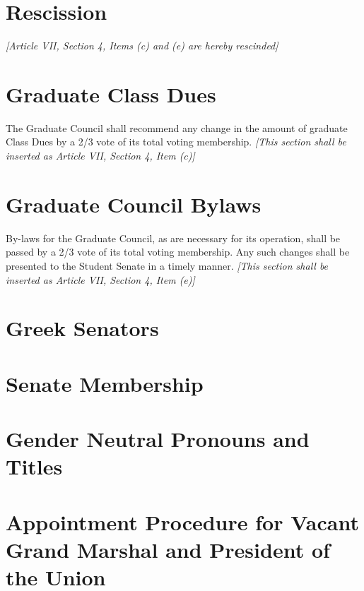 \documentclass{uniondoc}
\begin{document}

\section{Rescission}
\textit{[Article VII, Section 4, Items (c) and (e) are hereby rescinded]}

\section{Graduate Class Dues}
The Graduate Council shall recommend any change in the amount of graduate Class Dues by a 2/3 vote of its total voting membership.
\textit{[This section shall be inserted as Article VII, Section 4, Item (c)]}

\section{Graduate Council Bylaws}
By-laws for the Graduate Council, as are necessary for its operation, shall be passed by a 2/3 vote of its total voting membership. Any such changes shall be presented to the Student Senate in a timely manner.
\textit{[This section shall be inserted as Article VII, Section 4, Item (e)]}


\section{Greek Senators}

\section{Senate Membership}


\section{Gender Neutral Pronouns and Titles}

\section{Appointment Procedure for Vacant Grand Marshal and President of the Union}
\end{document}
